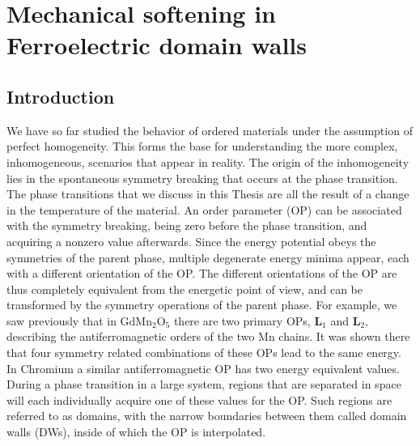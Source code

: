 \chapter{Mechanical softening in Ferroelectric domain walls}


\section{Introduction}
We have so far studied the behavior of ordered materials under the assumption of perfect homogeneity.
This forms the base for understanding the more complex, inhomogeneous, scenarios that appear in reality.
The origin of the inhomogeneity lies in the spontaneous symmetry breaking that occurs at the phase transition.
The phase transitions that we discuss in this Thesis are all the result of a change in the temperature of the material. 
An order parameter (OP) can be associated with the symmetry breaking, being zero before the phase transition, and acquiring a nonzero value afterwards.
Since the energy potential obeys the symmetries of the parent phase, multiple degenerate energy minima appear, each with a different orientation of the OP.
The different orientations of the OP are thus completely equivalent from the energetic point of view, and can be transformed by the symmetry operations of the parent phase.
For example, we saw previously that in GdMn$_2$O$_5$ there are two primary OPs, $\bm{L}_1$ and $\bm{L}_2$, describing the antiferromagnetic orders of the two Mn chains.
It was shown there that four symmetry related combinations of these OPs lead to the same energy.
In Chromium a similar antiferromagnetic OP has two energy equivalent values.
During a phase transition in a large system, regions that are separated in space will each individually acquire one of these values for the OP.
Such regions are referred to as domains, with the narrow boundaries between them called domain walls (DWs), inside of which the OP is interpolated.

